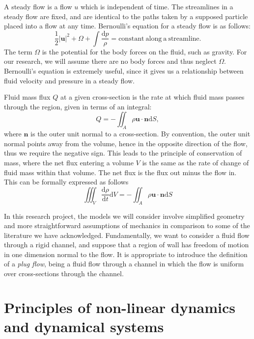 \documentclass{book}
\begin{document}
A steady flow is a flow $u$ which is independent of time.
The streamlines in a steady flow are fixed, and are identical to the paths taken by a supposed particle placed into a flow at any time.
Bernoulli's equation for a steady flow is as follows:
\begin{equation}
    \frac{1}{2}|\mathbf{u}|^2 + \Omega + \int\frac{\mathrm{d}p}{\rho} = \mathrm{constant~along~a~streamline}.
\end{equation}
The term $\Omega$ is the potential for the body forces on the fluid, such as gravity.
For our research, we will assume there are no body forces and thus neglect $\Omega$.
Bernoulli's equation is extremely useful, since it gives us a relationship between fluid velocity and pressure in a steady flow.

Fluid mass flux $Q$ at a given cross-section is the rate at which fluid mass passes through the region,
given in terms of an integral:
\begin{equation*}
    Q = -\iint_A \rho \mathbf{u} \cdot \mathbf{n} \mathrm{d}S,
\end{equation*}
where $\mathbf{n}$ is the outer unit normal to a cross-section.
By convention, the outer unit normal points away from the volume,
hence in the opposite direction of the flow, thus we require the negative sign.
This leads to the principle of conservation of mass, where the net flux entering a volume $V$ is the same as the rate of change of fluid mass within that volume.
The net flux is the flux out minus the flow in.
This can be formally expressed as follows
\begin{equation*}
    \iiint_V \frac{\mathrm{d}\rho}{\mathrm{d}t} \mathrm{d}V = - \iint_A \rho \mathbf{u} \cdot \mathbf{n} \mathrm{d}S 
\end{equation*} 

In this research project, the models we will consider involve simplified geometry and more straightforward assumptions of mechanics in comparison to some of the literature we have acknowledged.
Fundamentally, we want to consider a fluid flow through a rigid channel, and suppose that a region of wall has freedom of motion in one dimension normal to the flow.
It is appropriate to introduce the definition of a \textit{plug flow}, being a fluid flow through a channel in which the flow is uniform over cross-sections through the channel. 


\section{Principles of non-linear dynamics and dynamical systems}
\end{document}
